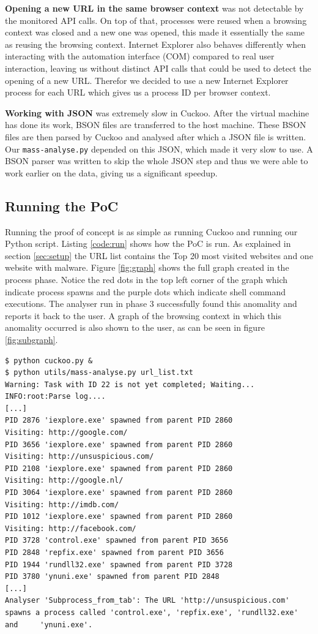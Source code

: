 \textbf{Opening a new URL in the same browser context} was not detectable by the monitored API calls. On top of that, processes were reused when a browsing context was closed and a new one was opened, this made it essentially the same as reusing the browsing context. Internet Explorer also behaves differently when interacting with the automation interface (COM) compared to real user interaction, leaving us without distinct API calls that could be used to detect the opening of a new URL. Therefor we decided to use a new Internet Explorer process for each URL which gives us a process ID per browser context.

\textbf{Working with JSON} was extremely slow in Cuckoo. After the virtual machine has done its work, BSON files are transferred to the host machine. These BSON files are then parsed by Cuckoo and analysed after which a JSON file is written. Our \texttt{mass-analyse.py} depended on this JSON, which made it very slow to use. A BSON parser was written to skip the whole JSON step and thus we were able to work earlier on the data, giving us a significant speedup.

\subsection{Running the PoC}

Running the proof of concept is as simple as running Cuckoo and running our Python script. Listing \ref{code:run} shows how the PoC is run. As explained in section \ref{sec:setup} the URL list contains the Top 20 most visited websites and one website with malware. Figure \ref{fig:graph} shows the full graph created in the process phase. Notice the red dots in the top left corner of the graph which indicate process spawns and the purple dots which indicate shell command executions. The analyser run in phase 3 successfully found this anomality and reports it back to the user. A graph of the browsing context in which this anomality occurred is also shown to the user, as can be seen in figure \ref{fig:subgraph}.

\pagebreak

\begin{lstlisting}[caption={Mass analyser being run},label={code:run}]
$ python cuckoo.py &
$ python utils/mass-analyse.py url_list.txt
Warning: Task with ID 22 is not yet completed; Waiting...
INFO:root:Parse log....
[...]
PID 2876 'iexplore.exe' spawned from parent PID 2860
Visiting: http://google.com/
PID 3656 'iexplore.exe' spawned from parent PID 2860
Visiting: http://unsuspicious.com/
PID 2108 'iexplore.exe' spawned from parent PID 2860
Visiting: http://google.nl/
PID 3064 'iexplore.exe' spawned from parent PID 2860
Visiting: http://imdb.com/
PID 1012 'iexplore.exe' spawned from parent PID 2860
Visiting: http://facebook.com/
PID 3728 'control.exe' spawned from parent PID 3656
PID 2848 'repfix.exe' spawned from parent PID 3656
PID 1944 'rundll32.exe' spawned from parent PID 3728
PID 3780 'ynuni.exe' spawned from parent PID 2848
[...]
Analyser 'Subprocess_from_tab': The URL 'http://unsuspicious.com' spawns a process called 'control.exe', 'repfix.exe', 'rundll32.exe' and     'ynuni.exe'.
\end{lstlisting}

